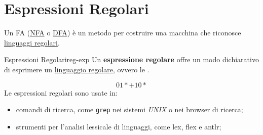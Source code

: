 \section{Espressioni Regolari}\label{sec:lr_espressioni_regolari} %
Un FA (\hyperref[sub:lr_automi_a_stati_finiti_non_deterministici]{NFA} o \hyperref[sub:lr_dfa]{DFA}) è un metodo per costruire una macchina che riconosce \hyperref[def:ling-reg]{linguaggi regolari}.
\begin{definition}{Espressioni Regolari}{reg-exp}
    Un \textbf{espressione regolare} offre un modo dichiarativo di esprimere un \hyperref[def:ling-reg]{linguaggio regolare}, ovvero le .
\end{definition}
\begin{example}{}{}
    \[
        01* + 10*
    \]
    Le espressioni regolari sono usate in:
    \begin{itemize}
        \item comandi di ricerca, come \texttt{grep} nei sistemi \textit{UNIX} o nei browser di ricerca;
        \item strumenti per l'analisi lessicale di linguaggi, come \ac{lex}, \ac{flex} e \ac{antlr};
    \end{itemize}
\end{example}
